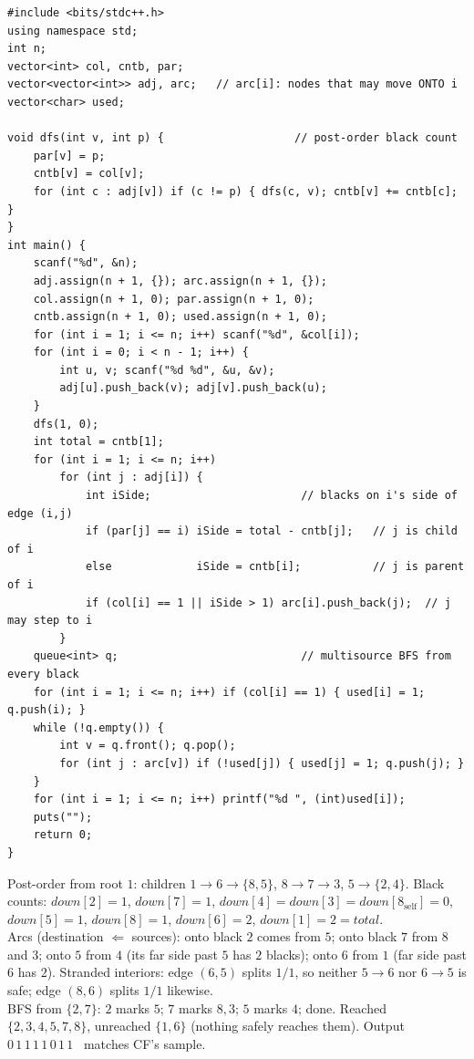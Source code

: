 \begin{lstlisting}[caption={Codeforces 1626E -- reroot the black count (down[c] / TOTAL-minus), turn each safe move into a directed arc, transposed multisource BFS from the blacks; O(n)}, label={lst:c20-1626e-soln}]
#include <bits/stdc++.h>
using namespace std;
int n;
vector<int> col, cntb, par;
vector<vector<int>> adj, arc;   // arc[i]: nodes that may move ONTO i
vector<char> used;

void dfs(int v, int p) {                    // post-order black count
    par[v] = p;
    cntb[v] = col[v];
    for (int c : adj[v]) if (c != p) { dfs(c, v); cntb[v] += cntb[c]; }
}
int main() {
    scanf("%d", &n);
    adj.assign(n + 1, {}); arc.assign(n + 1, {});
    col.assign(n + 1, 0); par.assign(n + 1, 0);
    cntb.assign(n + 1, 0); used.assign(n + 1, 0);
    for (int i = 1; i <= n; i++) scanf("%d", &col[i]);
    for (int i = 0; i < n - 1; i++) {
        int u, v; scanf("%d %d", &u, &v);
        adj[u].push_back(v); adj[v].push_back(u);
    }
    dfs(1, 0);
    int total = cntb[1];
    for (int i = 1; i <= n; i++)
        for (int j : adj[i]) {
            int iSide;                       // blacks on i's side of edge (i,j)
            if (par[j] == i) iSide = total - cntb[j];   // j is child of i
            else             iSide = cntb[i];           // j is parent of i
            if (col[i] == 1 || iSide > 1) arc[i].push_back(j);  // j may step to i
        }
    queue<int> q;                            // multisource BFS from every black
    for (int i = 1; i <= n; i++) if (col[i] == 1) { used[i] = 1; q.push(i); }
    while (!q.empty()) {
        int v = q.front(); q.pop();
        for (int j : arc[v]) if (!used[j]) { used[j] = 1; q.push(j); }
    }
    for (int i = 1; i <= n; i++) printf("%d ", (int)used[i]);
    puts("");
    return 0;
}
\end{lstlisting}

\begin{tracebox}[Official sample: $n=8$, blacks $2,7$, edges as stated $\Rightarrow$ \texttt{0 1 1 1 1 0 1 1}]
Post-order from root $1$: children $1\!\to\!6\!\to\!\{8,5\}$, $8\!\to\!7\!\to\!3$,
$5\!\to\!\{2,4\}$. Black counts: $\mathit{down}[2]{=}1$, $\mathit{down}[7]{=}1$,
$\mathit{down}[4]{=}\mathit{down}[3]{=}\mathit{down}[8_{\text{self}}]{=}0$,
$\mathit{down}[5]{=}1$, $\mathit{down}[8]{=}1$, $\mathit{down}[6]{=}2$,
$\mathit{down}[1]{=}2=\mathit{total}$.\\
Arcs (destination $\Leftarrow$ sources): onto black $2$ comes from $5$; onto black
$7$ from $8$ and $3$; onto $5$ from $4$ (its far side past $5$ has $2$ blacks); onto
$6$ from $1$ (far side past $6$ has $2$). Stranded interiors: edge $(6,5)$ splits
$1/1$, so neither $5\!\to\!6$ nor $6\!\to\!5$ is safe; edge $(8,6)$ splits $1/1$
likewise.\\
BFS from $\{2,7\}$: $2$ marks $5$; $7$ marks $8,3$; $5$ marks $4$; done. Reached
$\{2,3,4,5,7,8\}$, unreached $\{1,6\}$ (nothing safely reaches them). Output
$\boxed{0\,1\,1\,1\,1\,0\,1\,1}$ \checkmark\ matches CF's sample.
\end{tracebox}

